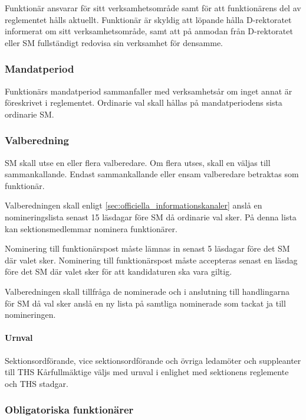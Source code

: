 \documentclass[a4paper,12pt]{article}
\begin{document}
Funktionär ansvarar för sitt verksamhetsområde samt för att funktionärens del av reglementet hålls aktuellt. Funktionär är skyldig att löpande hålla D-rektoratet informerat om sitt verksamhetsområde, samt att på anmodan från D-rektoratet eller SM fullständigt redovisa sin verksamhet för densamme.

\subsubsection{Mandatperiod}

Funktionärs mandatperiod sammanfaller med verksamhetsår om inget annat är föreskrivet i reglementet. Ordinarie val skall hållas på mandatperiodens sista ordinarie SM.

\subsubsection{Valberedning}

SM skall utse en eller flera valberedare. Om flera utses, skall en väljas till
sammankallande. Endast sammankallande eller ensam valberedare betraktas som funktionär.

Valberedningen skall enligt \ref{sec:officiella_informationskanaler} anslå en nomineringslista senast 15 läsdagar före SM då ordinarie val sker. På denna lista kan sektionsmedlemmar nominera funktionärer.

Nominering till funktionärspost måste lämnas in senast 5 läsdagar före det SM där valet sker. Nominering till funktionärspost måste accepteras senast en läsdag före det SM där valet sker för att kandidaturen ska vara giltig.

Valberedningen skall tillfråga de nominerade och i anslutning till handlingarna för SM då val sker anslå en ny lista på samtliga nominerade som tackat ja till nomineringen.

\paragraph{Urnval}

Sektionsordförande, vice sektionsordförande och övriga ledamöter och suppleanter till THS Kårfullmäktige väljs med urnval i enlighet med sektionens reglemente och THS stadgar.

\subsubsection{Obligatoriska funktionärer}
\end{document}
